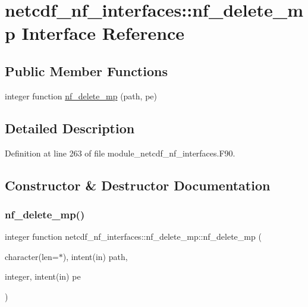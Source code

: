 \hypertarget{interfacenetcdf__nf__interfaces_1_1nf__delete__mp}{}\section{netcdf\+\_\+nf\+\_\+interfaces\+:\+:nf\+\_\+delete\+\_\+mp Interface Reference}
\label{interfacenetcdf__nf__interfaces_1_1nf__delete__mp}
\subsection*{Public Member Functions}
\begin{DoxyCompactItemize}
\item 
integer function \hyperlink{interfacenetcdf__nf__interfaces_1_1nf__delete__mp_a91030f7a8da775df74aaa6d2acdb7814}{nf\+\_\+delete\+\_\+mp} (path, pe)
\end{DoxyCompactItemize}


\subsection{Detailed Description}


Definition at line 263 of file module\+\_\+netcdf\+\_\+nf\+\_\+interfaces.\+F90.



\subsection{Constructor \& Destructor Documentation}
\mbox{\label{interfacenetcdf__nf__interfaces_1_1nf__delete__mp_a91030f7a8da775df74aaa6d2acdb7814}} 
\subsubsection{\texorpdfstring{nf\+\_\+delete\+\_\+mp()}{nf\_delete\_mp()}}
{\footnotesize\ttfamily integer function netcdf\+\_\+nf\+\_\+interfaces\+::nf\+\_\+delete\+\_\+mp\+::nf\+\_\+delete\+\_\+mp (\begin{DoxyParamCaption}\item[{character(len=$\ast$), intent(in)}]{path,  }\item[{integer, intent(in)}]{pe }\end{DoxyParamCaption})}



